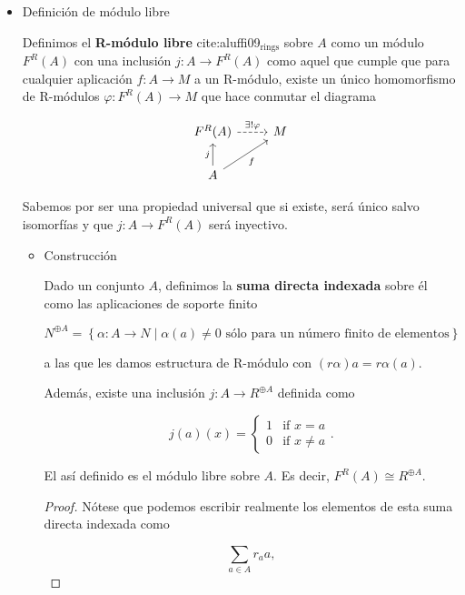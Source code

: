 \documentclass[11pt]{article}
\begin{document}
\begin{itemize}
\item Definición de módulo libre
\label{sec-7-5-3-1}
\begin{definition}
Definimos el \textbf{R-módulo libre} cite:aluffi09$_{\text{rings}}$ sobre $A$ como un módulo $F^R(A)$ 
con una inclusión $j : A \to F^R(A)$ como aquel que cumple que para cualquier 
aplicación $f : A \to M$ a un R-módulo, existe un único homomorfismo de 
R-módulos $\varphi:F^R(A) \to M$ que hace conmutar el diagrama

\[\begin{tikzcd}
F^R(A) \rar[dashed]{\exists!\varphi} & M \\
A \uar{j}\urar[swap]{f} &
\end{tikzcd}\]
\end{definition}

Sabemos por ser una propiedad universal que si existe, será único salvo
isomorfías y que $j\colon A \to F^R(A)$ será inyectivo.

\begin{itemize}
\item Construcción
\label{sec-7-5-3-1-1}
\begin{definition}
Dado un conjunto $A$, definimos la \textbf{suma directa indexada} sobre él como
las aplicaciones de soporte finito

\[
N^{\oplus A}
=
\left\{ \alpha\colon A \to N 
\mid 
\alpha(a) \neq 0 \text{ sólo para un número finito de elementos} \right\}
\]

a las que les damos estructura de R-módulo con $(r\alpha)a = r\alpha(a)$.
\end{definition}

Además, existe una inclusión $j\colon A \to R^{\oplus A}$ definida como

\[
j(a)(x) = \left\{\begin{array}{ll} 
1 & \mbox{if } x = a  \\
0 & \mbox{if } x \neq a 
\end{array} 
\right. .
\]

\begin{theorem}
El así definido es el módulo libre sobre $A$. Es decir, $F^R(A) \cong R^{\oplus A}$.
\end{theorem}

\begin{proof}
Nótese que podemos escribir realmente los elementos de esta suma directa
indexada como

\[
\sum_{a \in A} r_aa,
\]


\end{proof}
\end{itemize}
\end{itemize}
\end{document}
